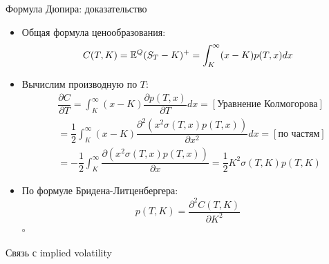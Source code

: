 \documentclass[aspectratio=169]{beamer}
\newcommand*{\QEDB}{\null\nobreak\hfill\ensuremath{\square}}
\begin{document}
\begin{frame}{Формула Дюпира: доказательство}
    \begin{itemize}
        \item Общая формула ценообразования:
        $$
            C(T, K) = \mathbb{E}^Q (S_T - K)^+ = \int_{K}^{\infty} (x-K) p(T, x) dx
        $$
        \item Вычислим производную по $T$:
        \begin{align*}
            &\dfrac{\partial C}{\partial T} =  
            \int_{K}^{\infty} (x-K) \dfrac{\partial p(T, x)}{\partial T} dx = [\text{Уравнение Колмогорова}]\\ 
            & =\dfrac{1}{2} \int_{K}^{\infty} (x-K) \dfrac{\partial^2 (x^2 \sigma(T, x) p(T, x))}{\partial x^2} dx = [\text{по частям}]\\
            & =-\dfrac{1}{2} \int_{K}^{\infty} \dfrac{\partial (x^2 \sigma(T, x) p(T, x))}{\partial x} =\dfrac{1}{2} K^2 \sigma(T, K) p(T, K)
        \end{align*}
        \item По формуле Бридена-Литценбергера:
        $$
            p(T, K) = \dfrac{\partial^2 C(T, K)}{\partial K^2} 
        $$\QEDB
    \end{itemize}
\end{frame}

\begin{frame}{Связь с implied volatility}
    \begin{itemize}
    \end{itemize}
\end{frame}
\end{document}
